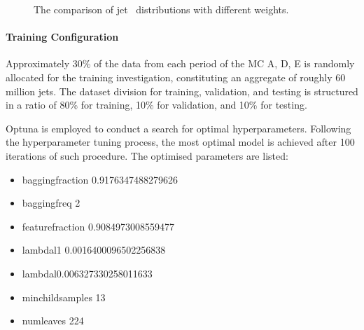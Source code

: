 \begin{figure}[htb]
	\centering
	 \quad
	\caption[]{
		The comparison of jet \pt~distributions with different weights. %
		\label{fig:QG-training-pt-weight-compare}
	}
\end{figure}

\paragraph{Training Configuration}\mbox{}\par

Approximately 30\% of the data from each period of the MC  A, D, E is randomly allocated for the training investigation, constituting an aggregate of roughly 60 million jets. 
The dataset division for training, validation, and testing is structured in a ratio of 80\% for training, 10\% for validation, and 10\% for testing.

Optuna is employed to conduct a search for optimal hyperparameters. Following the hyperparameter tuning process, the most optimal model is achieved after 100 iterations of such procedure. The optimised parameters are listed:

\begin{itemize}
	\item bagging\textunderscore fraction 0.9176347488279626
	\item bagging\textunderscore freq 2
	\item feature\textunderscore fraction 0.9084973008559477
	\item lambda\textunderscore l1 0.0016400096502256838
	\item lambda\textunderscore l0.006327330258011633
	\item min\textunderscore child\textunderscore samples 13
	\item num\textunderscore leaves 224
\end{itemize}

